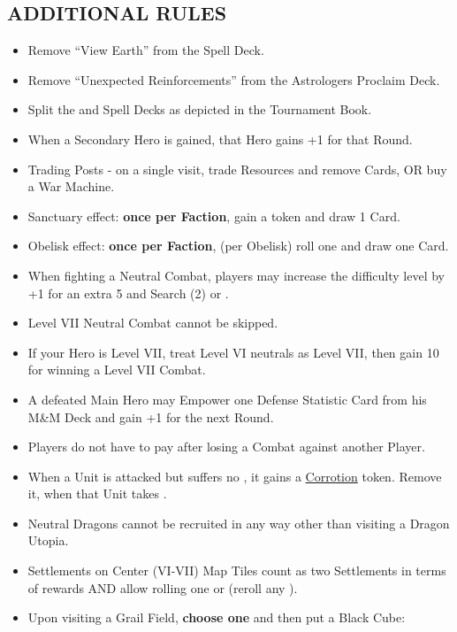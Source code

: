 \begin{multicols*}{2}
\subsection*{\MakeUppercase{Additional Rules}}
\begin{itemize}
  \item Remove ``View Earth'' from the Spell Deck.
  \item Remove ``Unexpected Reinforcements'' from the Astrologers Proclaim Deck.
  \item Split the  and Spell Decks as depicted in the Tournament Book.
  \item When a Secondary Hero is gained, that Hero gains +1  for that Round.
  \item Trading Posts - on a single visit, trade Resources and remove Cards, OR buy a War Machine.
  \item Sanctuary effect: \textbf{once per Faction}, gain a  token and draw 1 Card.
  \item Obelisk effect: \textbf{once per Faction}, (per Obelisk) roll one  and draw one Card.
  \item When fighting a Neutral Combat, players may increase the difficulty level by +1 for an extra 5  and Search (2)  or . %
  \item Level VII Neutral Combat cannot be skipped.
  \item If your Hero is Level VII, treat Level VI neutrals as Level VII, then gain 10  for winning a Level VII Combat.
  \item A defeated Main Hero may Empower one Defense Statistic Card from his M\&M Deck and gain +1  for the next Round.
  \item Players do not have to pay  after losing a Combat against another Player.
  \item When a Unit is attacked but suffers no , it gains a \href{https://archon-studio.com/files/manuals/homm/HoMM-Stronghold-Mission-Book-Beta_EN.pdf}{Corrotion} token. Remove it, when that Unit takes .
  \item Neutral Dragons cannot be recruited in any way other than visiting a Dragon Utopia.
  \item Settlements on Center (VI-VII) Map Tiles count as two Settlements in terms of rewards AND allow rolling one  or  (reroll any ).
  \item Upon visiting a Grail Field, \textbf{choose one} and then put a Black Cube:

\end{itemize}
\end{multicols*}
